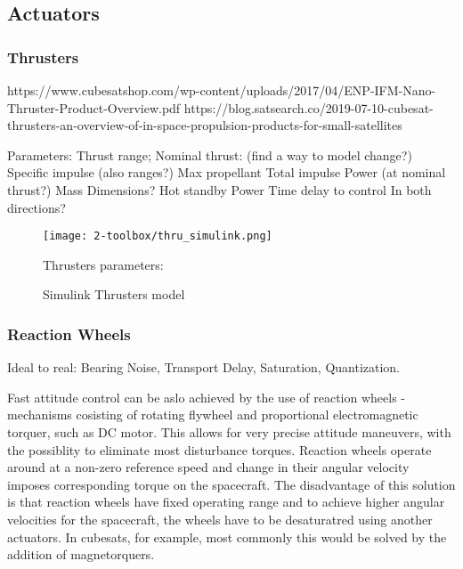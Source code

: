 \subsection{Actuators}

    \subsubsection{Thrusters}
        https://www.cubesatshop.com/wp-content/uploads/2017/04/ENP-IFM-Nano-Thruster-Product-Overview.pdf
        https://blog.satsearch.co/2019-07-10-cubesat-thrusters-an-overview-of-in-space-propulsion-products-for-small-satellites

        Parameters:
            Thrust range;
            Nominal thrust: (find a way to model change?)
            Specific impulse (also ranges?)
            Max propellant
            Total impulse
            Power (at nominal thrust?)
            Mass
            Dimensions?
            Hot standby Power
            Time delay to control
            In both directions? 


        \begin{figure}[hb]
            \centering
            \texttt{[image: 2-toolbox/thru\_simulink.png]}
            \caption{Simulink Thrusters model}
            \label{fig:thru_simulink}
            Thrusters parameters: 
        \end{figure}

    \subsubsection{Reaction Wheels}
        Ideal to real: Bearing Noise, Transport Delay, Saturation, Quantization.
        
        Fast attitude control can be aslo achieved by the use of reaction wheels - mechanisms cosisting of rotating flywheel and proportional electromagnetic torquer, such as DC motor. This allows for very precise attitude maneuvers, with the possiblity to eliminate most disturbance torques. Reaction wheels operate around at a non-zero reference speed and change in their angular velocity imposes corresponding torque on the spacecraft. The disadvantage of this solution is that reaction wheels have fixed operating range and to achieve higher angular velocities for the spacecraft, the wheels have to be desaturatred using another actuators. In cubesats, for example, most commonly this would be solved by the addition of magnetorquers.

